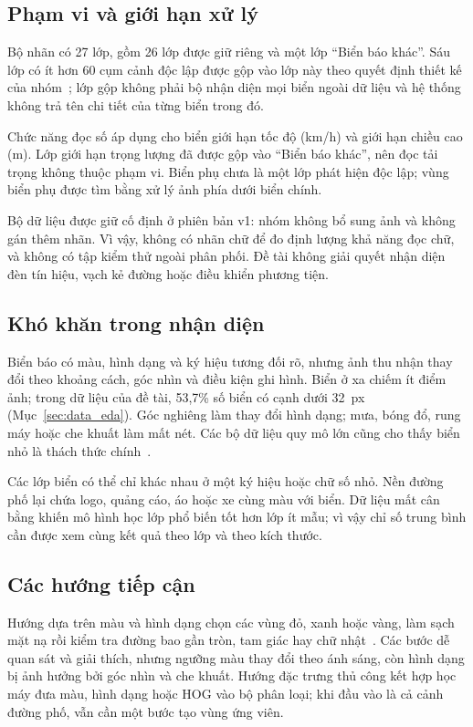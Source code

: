 \subsection{Phạm vi và giới hạn xử lý}
Bộ nhãn có 27 lớp, gồm 26 lớp được giữ riêng và một lớp ``Biển báo khác''. Sáu lớp có ít hơn 60 cụm cảnh độc lập được gộp vào lớp này theo quyết định thiết kế của nhóm~\cite{utci_nhanlop}; lớp gộp không phải bộ nhận diện mọi biển ngoài dữ liệu và hệ thống không trả tên chi tiết của từng biển trong đó.

Chức năng đọc số áp dụng cho biển giới hạn tốc độ (km/h) và giới hạn chiều cao (m). Lớp giới hạn trọng lượng đã được gộp vào ``Biển báo khác'', nên đọc tải trọng không thuộc phạm vi. Biển phụ chưa là một lớp phát hiện độc lập; vùng biển phụ được tìm bằng xử lý ảnh phía dưới biển chính.

Bộ dữ liệu được giữ cố định ở phiên bản v1: nhóm không bổ sung ảnh và không gán thêm nhãn. Vì vậy, không có nhãn chữ để đo định lượng khả năng đọc chữ, và không có tập kiểm thử ngoài phân phối. Đề tài không giải quyết nhận diện đèn tín hiệu, vạch kẻ đường hoặc điều khiển phương tiện.

\subsection{Khó khăn trong nhận diện}
Biển báo có màu, hình dạng và ký hiệu tương đối rõ, nhưng ảnh thu nhận thay đổi theo khoảng cách, góc nhìn và điều kiện ghi hình. Biển ở xa chiếm ít điểm ảnh; trong dữ liệu của đề tài, 53,7\% số biển có cạnh dưới 32~px (Mục~\ref{sec:data_eda}). Góc nghiêng làm thay đổi hình dạng; mưa, bóng đổ, rung máy hoặc che khuất làm mất nét. Các bộ dữ liệu quy mô lớn cũng cho thấy biển nhỏ là thách thức chính~\cite{zhu2016tt100k,ertler2020mapillary}.

Các lớp biển có thể chỉ khác nhau ở một ký hiệu hoặc chữ số nhỏ. Nền đường phố lại chứa logo, quảng cáo, áo hoặc xe cùng màu với biển. Dữ liệu mất cân bằng khiến mô hình học lớp phổ biến tốt hơn lớp ít mẫu; vì vậy chỉ số trung bình cần được xem cùng kết quả theo lớp và theo kích thước.

\subsection{Các hướng tiếp cận}
Hướng dựa trên màu và hình dạng chọn các vùng đỏ, xanh hoặc vàng, làm sạch mặt nạ rồi kiểm tra đường bao gần tròn, tam giác hay chữ nhật~\cite{escalera1997road,maldonado2007svm}. Các bước dễ quan sát và giải thích, nhưng ngưỡng màu thay đổi theo ánh sáng, còn hình dạng bị ảnh hưởng bởi góc nhìn và che khuất. Hướng đặc trưng thủ công kết hợp học máy đưa màu, hình dạng hoặc HOG vào bộ phân loại; khi đầu vào là cả cảnh đường phố, vẫn cần một bước tạo vùng ứng viên.


